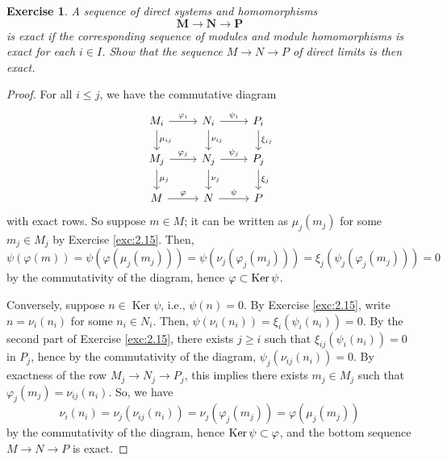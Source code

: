 \documentclass[12pt,letterpaper]{article}
\newtheorem{problem}{Exercise}[section]
\theoremstyle{definition}
\theoremstyle{remark}
\numberwithin{figure}{problem}
\numberwithin{equation}{section}
\let\Im\relax
\DeclareMathOperator{\Im}{Im}
\DeclareMathOperator{\Ker}{Ker}
\begin{document}
\begin{problem}
  A sequence of direct systems and homomorphisms
  \begin{equation*}
    \mathbf{M} \to \mathbf{N} \to \mathbf{P}
  \end{equation*}
  is \emph{exact} if the corresponding sequence of modules and module
  homomorphisms is exact for each $i \in I$.
  Show that the sequence $M \to N \to P$ of direct limits is then exact. %
\end{problem}
\begin{proof}
  For all $i \le j$, we have the commutative diagram
  \begin{equation*}
    \begin{tikzcd}
      M_i \rar{\varphi_i}\dar{\mu_{ij}} & N_i \rar{\psi_i}\dar{\nu_{ij}} & P_i\dar{\xi_{ij}}\\
      M_j \rar{\varphi_j}\dar{\mu_{j}} & N_j \rar{\psi_j}\dar{\nu_{j}} & P_j\dar{\xi_{j}}\\
      M \rar{\varphi} & N \rar{\psi} & P
    \end{tikzcd}
  \end{equation*}
  with exact rows.
  So suppose $m \in M$; it can be written as $\mu_j(m_j)$ for some $m_j \in M_j$
  by Exercise \ref{exc:2.15}.
  Then,
  \begin{equation*}
    \psi(\varphi(m)) = \psi(\varphi(\mu_j(m_j))) = \psi(\nu_j(\varphi_j(m_j))) =
    \xi_j(\psi_j(\varphi_j(m_j))) = 0
  \end{equation*}
  by the commutativity of the diagram, hence $\Im \varphi \subset \Ker \psi$.
  \par Conversely, suppose $n \in \Ker\psi$, i.e., $\psi(n) = 0$.
  By Exercise \ref{exc:2.15}, write $n = \nu_i(n_i)$ for some $n_i \in N_i$.
  Then, $\psi(\nu_i(n_i)) = \xi_i(\psi_i(n_i)) = 0$.
  By the second part of Exercise \ref{exc:2.15}, there exists $j \ge i$ such
  that $\xi_{ij}(\psi_i(n_i)) = 0$ in $P_j$, hence by the commutativity of the
  diagram, $\psi_j(\nu_{ij}(n_i)) = 0$.
  By exactness of the row $M_j \to N_j \to P_j$, this implies there exists $m_j
  \in M_j$ such that $\varphi_j(m_j) = \nu_{ij}(n_i)$.
  So, we have
  \begin{equation*}
    \nu_i(n_i) = \nu_j(\nu_{ij}(n_i)) = \nu_j(\varphi_j(m_j)) =
    \varphi(\mu_j(m_j))
  \end{equation*}
  by the commutativity of the diagram, hence $\Ker\psi \subset \Im \varphi$,
  and the bottom sequence $M \to N \to P$ is exact.
\end{proof}
\end{document}
